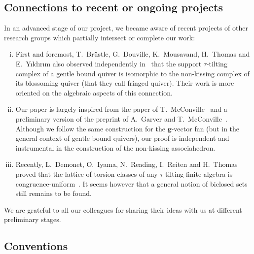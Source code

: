 \documentclass{memo-l}
\theoremstyle{definition}
\renewcommand{\b}[1]{\mathbf{#1}} %
\begin{document}
\subsection*{Connections to recent or ongoing projects}

In an advanced stage of our project, we became aware of recent projects of other research groups which partially intersect or complete our work:
\begin{enumerate}[(i)]
\item First and foremost, T.~Br\"ustle, G.~Douville, K.~Mousavand, H.~Thomas and E.~Y\i{}ld\i{}r\i{}m also observed independently in~\cite{BrustleDouvilleMousavandThomasYildirim} that the support $\tau$-tilting complex of a gentle bound quiver is isomorphic to the non-kissing complex of its blossoming quiver (that they call fringed quiver). Their work is more oriented on the algebraic aspects of this connection.
\item Our paper is largely inspired from the paper of T.~McConville~\cite{McConville} and a preliminary version of the preprint of A.~Garver and T.~McConville~\cite{GarverMcConville-grid}. Although we follow the same construction for the $\b{g}$-vector fan (but in the general context of gentle bound quivers), our proof is independent and instrumental in the construction of the non-kissing associahedron.
\item Recently, L.~Demonet, O.~Iyama, N.~Reading, I.~Reiten and H.~Thomas proved that the lattice of torsion classes of any $\tau$-tilting finite algebra is congruence-uniform~\cite{DemonetIyamaReadingReitenThomas}. It seems however that a general notion of biclosed sets still remains to be found.
\end{enumerate}
We are grateful to all our colleagues for sharing their ideas with us at different preliminary stages.

\subsection*{Conventions}
\end{document}
